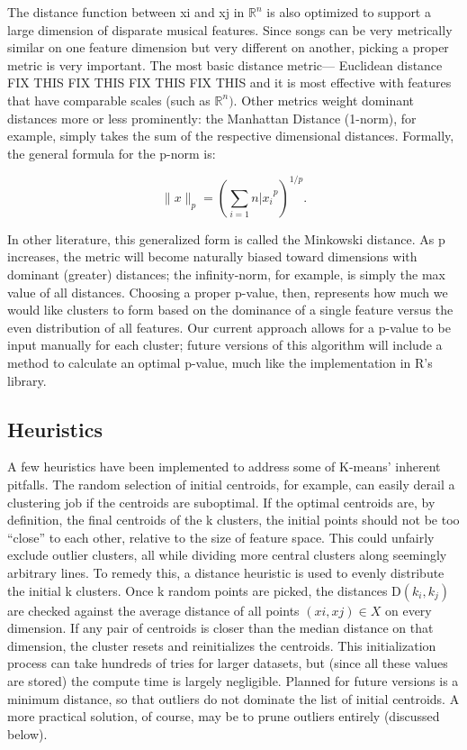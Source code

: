 \documentclass[12pt,twocolumn,titlepage]{article}
\begin{document}
The distance function between xi and xj in $\mathbb{R}^n$ is also optimized to support a large dimension of disparate musical features. Since songs can be very metrically similar on one feature dimension but very different on another, picking a proper metric is very important. The most basic distance metric— Euclidean distance FIX THIS FIX THIS FIX THIS FIX THIS and it is most effective with features that have comparable scales (such as $\mathbb{R}^n)$. \cite{glynn} Other metrics weight dominant distances more or less prominently: the Manhattan Distance (1-norm), for example, simply takes the sum of the respective dimensional distances. Formally, the general formula for the p-norm is:

\begin{equation}\label{}
\|x\|_p = (\sum_{i=1}{n}{|x_i}^p)^{1/p}.
\end{equation}

In other literature, this  generalized form is called the Minkowski distance. \cite{Meyer} As p increases, the metric will become naturally biased toward dimensions with dominant (greater) distances; the infinity-norm, for example, is simply the max value of all distances. Choosing a proper p-value, then, represents how much we would like clusters to form based on the dominance of a single feature versus the even distribution of all features. Our current approach allows for a p-value to be input manually for each cluster; future versions of this algorithm will include a method to calculate an optimal p-value, much like the implementation in R's library. \cite{pvclust}

\subsection{Heuristics}

A few heuristics have been implemented to address some of K-means' inherent pitfalls. The random selection of initial centroids, for example, can easily derail a clustering job if the centroids are suboptimal. If the optimal centroids are, by definition, the final centroids of the k clusters, the initial points should not be too ``close'' to each other, relative to the size of feature space. This could unfairly exclude outlier clusters, all while dividing more central clusters along seemingly arbitrary lines. To remedy this, a distance heuristic is used to evenly distribute the initial k clusters. \cite{Zerbst} Once k random points are picked, the distances $\mathrm{D}(k_i, k_j)$ are checked against the average distance of all points $(xi, xj) \in X$ on every dimension. If any pair of centroids is closer than the median distance on that dimension, the cluster resets and reinitializes the centroids. This initialization process can take hundreds of tries for larger datasets, but (since all these values are stored) the compute time is largely negligible. Planned for future versions is a minimum distance, so that outliers do not dominate the list of initial centroids. A more practical solution, of course, may be to prune outliers entirely (discussed below).
\end{document}
